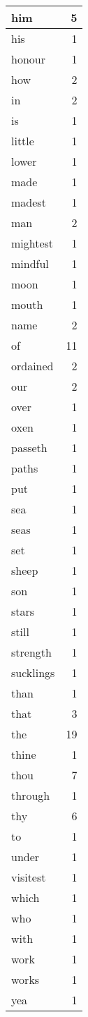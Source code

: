 \begin{center}
\begin{longtable}{l|r}
him & 5 \\ \hline
his & 1 \\ \hline
honour & 1 \\ \hline
how & 2 \\ \hline
in & 2 \\ \hline
is & 1 \\ \hline
little & 1 \\ \hline
lower & 1 \\ \hline
made & 1 \\ \hline
madest & 1 \\ \hline
man & 2 \\ \hline
mightest & 1 \\ \hline
mindful & 1 \\ \hline
moon & 1 \\ \hline
mouth & 1 \\ \hline
name & 2 \\ \hline
of & 11 \\ \hline
ordained & 2 \\ \hline
our & 2 \\ \hline
over & 1 \\ \hline
oxen & 1 \\ \hline
passeth & 1 \\ \hline
paths & 1 \\ \hline
put & 1 \\ \hline
sea & 1 \\ \hline
seas & 1 \\ \hline
set & 1 \\ \hline
sheep & 1 \\ \hline
son & 1 \\ \hline
stars & 1 \\ \hline
still & 1 \\ \hline
strength & 1 \\ \hline
sucklings & 1 \\ \hline
than & 1 \\ \hline
that & 3 \\ \hline
the & 19 \\ \hline
thine & 1 \\ \hline
thou & 7 \\ \hline
through & 1 \\ \hline
thy & 6 \\ \hline
to & 1 \\ \hline
under & 1 \\ \hline
visitest & 1 \\ \hline
which & 1 \\ \hline
who & 1 \\ \hline
with & 1 \\ \hline
work & 1 \\ \hline
works & 1 \\ \hline
yea & 1 \\ \hline
\end{longtable}
\end{center}



